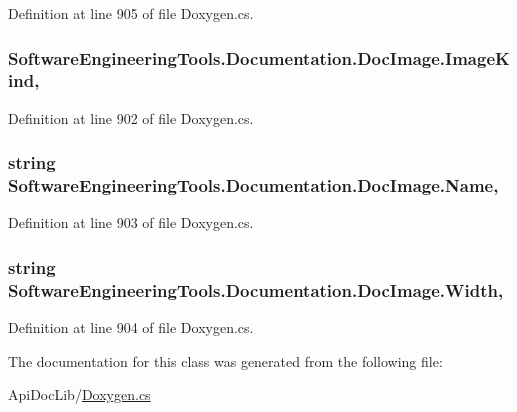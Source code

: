 Definition at line 905 of file Doxygen.\+cs.

\hypertarget{class_software_engineering_tools_1_1_documentation_1_1_doc_image_aa73b29c8c230474bd80d01dfa25555ff}{
\subsubsection[{Image\+Kind}]{ Software\+Engineering\+Tools.\+Documentation.\+Doc\+Image.\+Image\+Kind\hspace{0.3cm}{\ttfamily [get]}, {\ttfamily [set]}}}\label{class_software_engineering_tools_1_1_documentation_1_1_doc_image_aa73b29c8c230474bd80d01dfa25555ff}


Definition at line 902 of file Doxygen.\+cs.

\hypertarget{class_software_engineering_tools_1_1_documentation_1_1_doc_image_a18a4f96074d4dad07c0811896dd4305b}{
\subsubsection[{Name}]{\setlength{\rightskip}{0pt plus 5cm}string Software\+Engineering\+Tools.\+Documentation.\+Doc\+Image.\+Name\hspace{0.3cm}{\ttfamily [get]}, {\ttfamily [set]}}}\label{class_software_engineering_tools_1_1_documentation_1_1_doc_image_a18a4f96074d4dad07c0811896dd4305b}


Definition at line 903 of file Doxygen.\+cs.

\hypertarget{class_software_engineering_tools_1_1_documentation_1_1_doc_image_a697f5c432b0a513b53dec61f66ad43ee}{
\subsubsection[{Width}]{\setlength{\rightskip}{0pt plus 5cm}string Software\+Engineering\+Tools.\+Documentation.\+Doc\+Image.\+Width\hspace{0.3cm}{\ttfamily [get]}, {\ttfamily [set]}}}\label{class_software_engineering_tools_1_1_documentation_1_1_doc_image_a697f5c432b0a513b53dec61f66ad43ee}


Definition at line 904 of file Doxygen.\+cs.



The documentation for this class was generated from the following file\+:\begin{DoxyCompactItemize}
\item 
Api\+Doc\+Lib/\hyperlink{_doxygen_8cs}{Doxygen.\+cs}\end{DoxyCompactItemize}

